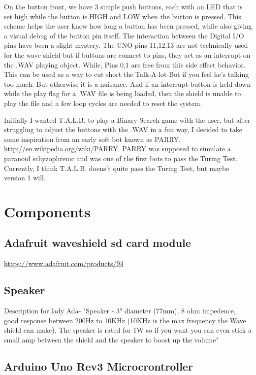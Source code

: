 \documentclass[a4paper,6pt]{article}
\begin{document}
    On the button front, we have 3 simple push buttons, each with an LED that is set high while the button
is HIGH and LOW when the button is pressed.  This scheme helps the user know how long a button has been 
pressed, while also giving a visual debug of the button pin itself.  The interaction between the Digital
I/O pins have been a slight mystery.  The UNO pins 11,12,13 are not technically used for the wave shield
but if buttons are connect to pins, they act as an interrupt on the .WAV playing object.  While, Pins 0,1 are 
free from this side effect behavior.  This can be used as a way to cut short the Talk-A-lot-Bot if you feel 
he's talking too much.  But otherwise it is a nuisance.  And if an interrupt button is held down while the play 
flag for a .WAV file is being loaded, then the shield is unable to play the file and a few loop cycles are needed 
to reset the system.  

    Initially I wanted T.A.L.B. to play a Binary Search game with the user, but after struggling to adjust the 
buttons with the .WAV in a fun way, I decided to take some inspiration from an early soft bot known as PARRY. 
\url{http://en.wikipedia.org/wiki/PARRY}.  PARRY  was supposed to simulate a paranoid schyzophrenic and was one of the first 
bots to pass the Turing Test.  Currently, I think T.A.L.B. doens't quite pass the Turing Test, but maybe version 1 will. 
\section{Components}
\label{sec-2}
\subsection{Adafruit waveshield sd card module}
\label{sec-2-1}
\url{https://www.adafruit.com/products/94}

\subsection{Speaker}
\label{sec-2-2}
Description for lady Ada-
"Speaker - 3" diameter (77mm), 8 ohm impedence, good response 
between 200Hz to 10KHz (10KHz is the max frequency 
the Wave shield can make). The speaker is rated for 
1W so if you want you can even stick a small amp 
between the shield and the speaker to boost up the volume"

\subsection{Arduino Uno Rev3 Microcrontroller}
\label{sec-2-3}
\end{document}
